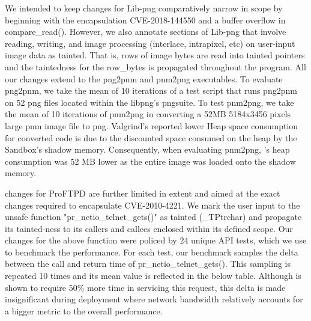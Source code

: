 We intended to keep \systemname changes for Lib-png comparatively narrow in scope by beginning with the encapsulation CVE-2018-144550 and a buffer overflow in compare\_read(). However, we also annotate sections of Lib-png that involve reading, writing, and image processing (interlace, intrapixel, etc) on user-input image data as tainted. That is, rows of image bytes are read into tainted pointers and the taintedness for the row\_bytes is propagated throughout the program. All our changes extend to the png2pnm and pnm2png executables. To evaluate png2pnm, we take the mean of 10 iterations of a test script that runs png2pnm on 52 png files located within the libpng's pngsuite. To test pnm2png, we take the mean of 10 iterations of pnm2png in converting a 52MB 5184x3456 pixels large pnm image file to png. Valgrind's reported lower Heap space consumption for \systemname converted code is due to the discounted space consumed on the heap by the Sandbox's shadow memory. Consequently, when evaluating pnm2png, \systemname's heap consumption was 52 MB lower as the entire image was loaded onto the shadow memory.  

\systemname changes for ProFTPD are further limited in extent and aimed at the exact changes required to encapsulate CVE-2010-4221. We mark the user input to the unsafe function "pr\_netio\_telnet\_gets()" as tainted (\_TPtr\<char\>) and propagate its tainted-ness to its callers and callees enclosed within its defined scope. Our changes for the above function were policed by 24 unique API tests, which we use to benchmark the performance. For each test, our benchmark samples the delta between the call and return time of pr\_netio\_telnet\_gets(). This sampling is repeated 10 times and its mean value is reflected in the below table. Although \systemname is shown to require 50\% more time in servicing this request, this delta is made insignificant during deployment where network bandwidth relatively accounts for a bigger metric to the overall performance.

